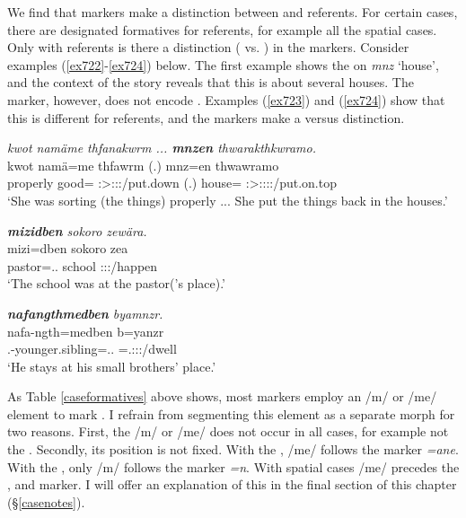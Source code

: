We find that  markers make a distinction between  and  referents. For certain cases, there are designated formatives for  referents, for example all the spatial cases. Only with  referents is there a  distinction (\Sg{} vs. \Nsg{}) in the  markers. Consider examples (\ref{ex722}-\ref{ex724}) below. The first example shows the   on \emph{mnz} `house', and the context of the story reveals that this is about several houses. The  marker, however, does not encode . Examples (\ref{ex723}) and (\ref{ex724}) show that this is different for  referents, and the  markers make a  versus  distinction.

\begin{exe}
	\ex \emph{kwot namäme thfanakwrm ... \textbf{mnzen} thwarakthkwramo.}\\
	\gll kwot namä=me thfawrm (.) mnz=en thwawramo\\
	properly good=\Ins{} \Stsg:\Sbj>\Stpl:\Obj:\Pst:\Dur/put.down (.) house=\Loc{} \Stsg:\Sbj>\Stpl:\Io:\Pst:\Dur:\Andat/put.on.top\\ 
	\trans `She was sorting (the things) properly ... She put the things back in the houses.'
	\label{ex722}
\end{exe}
\begin{exe}
	\ex \emph{\textbf{mizidben} sokoro zewära.}\\
	\gll mizi=dben sokoro zea\\
	pastor=\Loc.\Anim.\Sg{} school \Sg:\Sbj:\Pst:\Pfv/happen\\
	\trans `The school was at the pastor('s place).'
	\label{ex723}
\end{exe}	
\begin{exe}
	\ex \emph{\textbf{nafangthmedben} byamnzr.}\\
	\gll nafa-ngth=medben b=yanzr\\
	\Third.\Poss-younger.sibling=\Loc.\Anim.\Nsg{} \Med=\Tsg.\Masc:\Sbj:\Nonpast:\Ipfv/dwell\\
	\trans `He stays at his small brothers' place.'
	\label{ex724}
\end{exe}
		
As Table \ref{caseformatives} above shows, most  markers employ an /m/ or /me/ element to mark  . I refrain from segmenting this element as a separate morph for two reasons. First, the /m/ or /me/ does not occur in all cases, for example not the  . Secondly, its position is not fixed. With the , /me/ follows the  marker \emph{=ane}. With the , only /m/ follows the  marker \emph{=n}. With spatial cases /me/ precedes the ,  and  marker. I will offer an explanation of this in the final section of this chapter (\S{}\ref{casenotes}).%

